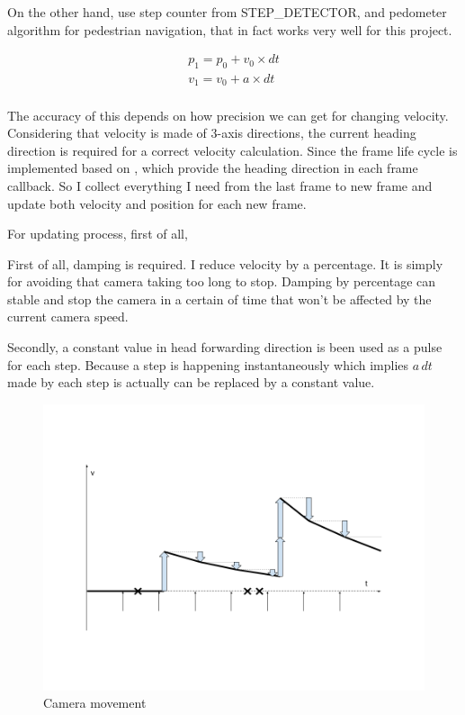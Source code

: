 On the other hand, use step counter from STEP\_DETECTOR, and pedometer algorithm for pedestrian navigation, that in fact works very well for this project.

\[
\begin{array}{lr}
p_1 = p_0 + v_0 \times dt\\
v_1 = v_0 + a \times dt\\
\end{array}
\]

The accuracy of this depends on how precision we can get for changing velocity. Considering that velocity is made of 3-axis directions, the current heading direction is required for a correct velocity calculation. Since the frame life cycle is implemented based on \parencite{google.vr-sdk.2016}, which provide the heading direction in each frame callback. So I collect everything I need from the last frame to new frame and update both velocity and position for each new frame.

For updating process, first of all, 

First of all, damping is required. I reduce velocity by a percentage. It is simply for avoiding that camera taking too long to stop. Damping by percentage can stable and stop the camera in a certain of time that won't be affected by the current camera speed. 


Secondly, a constant value in head forwarding direction is been used as a pulse for each step. Because a step is happening instantaneously which implies $a\,dt$ made by each step is actually can be replaced by a constant value.

\begin{figure}[H]
\caption[camera-movement]{Camera movement}
\label{fig:camera-movement}
\centering
\includegraphics[width=\linewidth]{Figures/camera-movement.png}
\decoRule
\end{figure}


